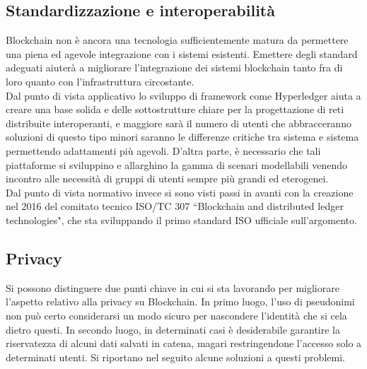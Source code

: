     \subsection{Standardizzazione e interoperabilità}
        Blockchain non è ancora una tecnologia sufficientemente matura da permettere una piena ed agevole integrazione con i sistemi esistenti. Emettere degli standard adeguati aiuterà a migliorare l'integrazione dei sistemi blockchain tanto fra di loro quanto con l'infrastruttura circostante. \\
        Dal punto di vista applicativo lo sviluppo di framework come Hyperledger aiuta a creare una base solida e delle sottostrutture chiare per la progettazione di reti distribuite interoperanti, e maggiore sarà il numero di utenti che abbracceranno soluzioni di questo tipo minori saranno le differenze critiche tra sistema e sistema permettendo adattamenti più agevoli. D'altra parte, è necessario che tali piattaforme si sviluppino e allarghino la gamma di scenari modellabili venendo incontro alle necessità di gruppi di utenti sempre più grandi ed eterogenei. \\
        Dal punto di vista normativo invece si sono visti passi in avanti con la creazione nel 2016 del comitato tecnico ISO/TC 307 ``Blockchain and distributed ledger technologies", che sta sviluppando il primo standard ISO ufficiale sull'argomento.

    \subsection{Privacy}
        Si possono distinguere due punti chiave in cui si sta lavorando per migliorare l'aspetto relativo alla privacy su Blockchain. In primo luogo, l'uso di pseudonimi non può certo considerarsi un modo sicuro per nascondere l'identità che si cela dietro questi. In secondo luogo, in determinati casi è desiderabile garantire la riservatezza di alcuni dati salvati in catena, magari restringendone l'accesso solo a determinati utenti. Si riportano nel seguito alcune soluzioni a questi problemi.
